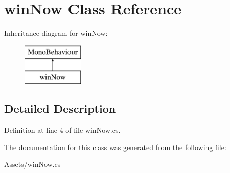 \hypertarget{classwin_now}{\section{win\+Now Class Reference}
\label{classwin_now}
}
Inheritance diagram for win\+Now\+:\begin{figure}[H]
\begin{center}
\leavevmode
\includegraphics[height=2.000000cm]{classwin_now}
\end{center}
\end{figure}


\subsection{Detailed Description}


Definition at line 4 of file win\+Now.\+cs.



The documentation for this class was generated from the following file\+:\begin{DoxyCompactItemize}
\item 
Assets/win\+Now.\+cs\end{DoxyCompactItemize}
